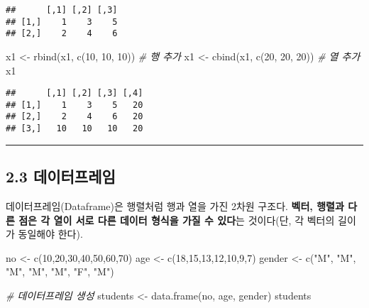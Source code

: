 \documentclass[
]{article}
\newenvironment{Shaded}{\begin{snugshade}}{\end{snugshade}}
\newcommand{\CommentTok}[1]{\textcolor[rgb]{0.56,0.35,0.01}{\textit{#1}}}
\newcommand{\DecValTok}[1]{\textcolor[rgb]{0.00,0.00,0.81}{#1}}
\newcommand{\FunctionTok}[1]{\textcolor[rgb]{0.00,0.00,0.00}{#1}}
\newcommand{\NormalTok}[1]{#1}
\newcommand{\OtherTok}[1]{\textcolor[rgb]{0.56,0.35,0.01}{#1}}
\newcommand{\StringTok}[1]{\textcolor[rgb]{0.31,0.60,0.02}{#1}}
\begin{document}
\begin{verbatim}
##      [,1] [,2] [,3]
## [1,]    1    3    5
## [2,]    2    4    6
\end{verbatim}

\begin{Shaded}
\begin{Highlighting}[]
\NormalTok{x1 }\OtherTok{\textless{}{-}} \FunctionTok{rbind}\NormalTok{(x1, }\FunctionTok{c}\NormalTok{(}\DecValTok{10}\NormalTok{, }\DecValTok{10}\NormalTok{, }\DecValTok{10}\NormalTok{))  }\CommentTok{\# 행 추가}
\NormalTok{x1 }\OtherTok{\textless{}{-}} \FunctionTok{cbind}\NormalTok{(x1, }\FunctionTok{c}\NormalTok{(}\DecValTok{20}\NormalTok{, }\DecValTok{20}\NormalTok{, }\DecValTok{20}\NormalTok{))  }\CommentTok{\# 열 추가}
\NormalTok{x1}
\end{Highlighting}
\end{Shaded}

\begin{verbatim}
##      [,1] [,2] [,3] [,4]
## [1,]    1    3    5   20
## [2,]    2    4    6   20
## [3,]   10   10   10   20
\end{verbatim}

\begin{center}\rule{0.5\linewidth}{0.5pt}\end{center}

\hypertarget{uxb370uxc774uxd130uxd504uxb808uxc784}{%
\subsection{2.3
데이터프레임}\label{uxb370uxc774uxd130uxd504uxb808uxc784}}

데이터프레임(Dataframe)은 행렬처럼 행과 열을 가진 2차원 구조다.
\textbf{벡터, 행렬과 다른 점은 각 열이 서로 다른 데이터 형식을 가질 수
있다}는 것이다(단, 각 벡터의 길이가 동일해야 한다).

\begin{Shaded}
\begin{Highlighting}[]
\NormalTok{no }\OtherTok{\textless{}{-}} \FunctionTok{c}\NormalTok{(}\DecValTok{10}\NormalTok{,}\DecValTok{20}\NormalTok{,}\DecValTok{30}\NormalTok{,}\DecValTok{40}\NormalTok{,}\DecValTok{50}\NormalTok{,}\DecValTok{60}\NormalTok{,}\DecValTok{70}\NormalTok{)}
\NormalTok{age }\OtherTok{\textless{}{-}} \FunctionTok{c}\NormalTok{(}\DecValTok{18}\NormalTok{,}\DecValTok{15}\NormalTok{,}\DecValTok{13}\NormalTok{,}\DecValTok{12}\NormalTok{,}\DecValTok{10}\NormalTok{,}\DecValTok{9}\NormalTok{,}\DecValTok{7}\NormalTok{)}
\NormalTok{gender }\OtherTok{\textless{}{-}} \FunctionTok{c}\NormalTok{(}\StringTok{"M"}\NormalTok{, }\StringTok{"M"}\NormalTok{, }\StringTok{"M"}\NormalTok{, }\StringTok{"M"}\NormalTok{, }\StringTok{"M"}\NormalTok{, }\StringTok{"F"}\NormalTok{, }\StringTok{"M"}\NormalTok{)}

\CommentTok{\# 데이터프레임 생성}
\NormalTok{students }\OtherTok{\textless{}{-}} \FunctionTok{data.frame}\NormalTok{(no, age, gender)}
\NormalTok{students}
\end{Highlighting}
\end{Shaded}
\end{document}
